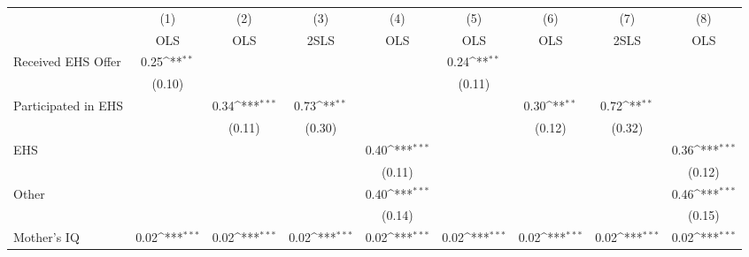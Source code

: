 {
\def\sym#1{\ifmmode^{#1}\else\(^{#1}\)\fi}
\begin{tabular}{l*{8}{c}}
\hline\hline
                    &\multicolumn{1}{c}{(1)}&\multicolumn{1}{c}{(2)}&\multicolumn{1}{c}{(3)}&\multicolumn{1}{c}{(4)}&\multicolumn{1}{c}{(5)}&\multicolumn{1}{c}{(6)}&\multicolumn{1}{c}{(7)}&\multicolumn{1}{c}{(8)}\\
                    &\multicolumn{1}{c}{OLS}&\multicolumn{1}{c}{OLS}&\multicolumn{1}{c}{2SLS}&\multicolumn{1}{c}{OLS}&\multicolumn{1}{c}{OLS}&\multicolumn{1}{c}{OLS}&\multicolumn{1}{c}{2SLS}&\multicolumn{1}{c}{OLS}\\
\hline
Received EHS Offer  &        0.25\sym{**} &                     &                     &                     &        0.24\sym{**} &                     &                     &                     \\
                    &      (0.10)         &                     &                     &                     &      (0.11)         &                     &                     &                     \\
[1em]
Participated in EHS &                     &        0.34\sym{***}&        0.73\sym{**} &                     &                     &        0.30\sym{**} &        0.72\sym{**} &                     \\
                    &                     &      (0.11)         &      (0.30)         &                     &                     &      (0.12)         &      (0.32)         &                     \\
[1em]
EHS                 &                     &                     &                     &        0.40\sym{***}&                     &                     &                     &        0.36\sym{***}\\
                    &                     &                     &                     &      (0.11)         &                     &                     &                     &      (0.12)         \\
[1em]
Other               &                     &                     &                     &        0.40\sym{***}&                     &                     &                     &        0.46\sym{***}\\
                    &                     &                     &                     &      (0.14)         &                     &                     &                     &      (0.15)         \\
[1em]
Mother's IQ         &        0.02\sym{***}&        0.02\sym{***}&        0.02\sym{***}&        0.02\sym{***}&        0.02\sym{***}&        0.02\sym{***}&        0.02\sym{***}&        0.02\sym{***}\\

\end{tabular}}
